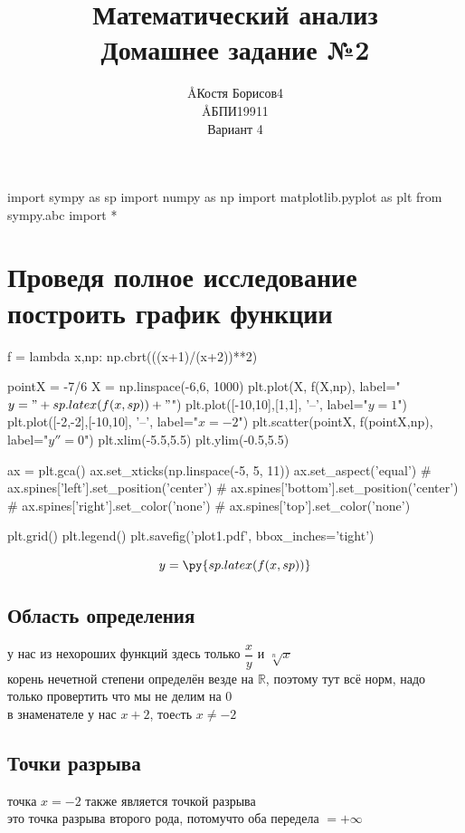 \documentclass{article}
\title{Математический анализ \\ Домашнее задание №2}
\author{\AA{Костя Борисов}{4} \\ \AA{БПИ199}{11} \\ Вариант 4}
\begin{document}
  \maketitle

  \begin{pycode}
    import sympy as sp
    import numpy as np
    import matplotlib.pyplot as plt
    from sympy.abc import *
  \end{pycode}

  \section{Проведя полное исследование построить график функции}
  \begin{pycode}
    f = lambda x,np: np.cbrt(((x+1)/(x+2))**2)

    pointX = -7/6
    X = np.linspace(-6,6, 1000)
    plt.plot(X, f(X,np), label="$y="+sp.latex(f(x,sp))+"$")
    plt.plot([-10,10],[1,1], '--', label="$y=1$")
    plt.plot([-2,-2],[-10,10], '--', label="$x=-2$")
    plt.scatter(pointX, f(pointX,np), label="$y''=0$")
    plt.xlim(-5.5,5.5)
    plt.ylim(-0.5,5.5)

    ax = plt.gca()
    ax.set_xticks(np.linspace(-5, 5, 11))
    ax.set_aspect('equal')
    # ax.spines['left'].set_position('center')
    # ax.spines['bottom'].set_position('center')
    # ax.spines['right'].set_color('none')
    # ax.spines['top'].set_color('none')

    plt.grid()
    plt.legend()
    plt.savefig('plot1.pdf', bbox_inches='tight')
  \end{pycode}
  \[ y = \py{sp.latex(f(x,sp))} \]

  \subsection{Область определения}
  у нас из нехороших функций здесь только $\dfrac{x}{y}$ и $\sqrt[n]{x}$ \\
  корень нечетной степени определён везде на $\mathbb{R}$, поэтому тут всё норм, надо только провертить что мы не делим на 0 \\
  в знаменателе у нас $x+2$, тоеcть $x\not=-2$ \\

  \subsection{Точки разрыва}
  точка $x=-2$ также является точкой разрыва \\
  это точка разрыва второго рода, потомучто оба передела $=+\infty$
\end{document}

